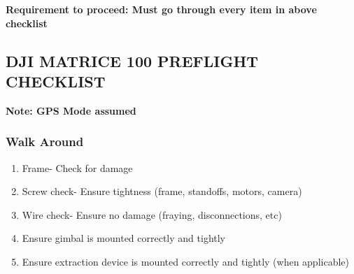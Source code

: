\textbf{Requirement to proceed: Must go through every item in above checklist}







\clearpage
\subsection{DJI MATRICE 100 PREFLIGHT CHECKLIST}
\textbf{Note: GPS Mode assumed}

\subsubsection{Walk Around}
\begin{enumerate}
\setlength{\itemsep}{0em}
\setlength{\parskip}{0em}
\item Frame- Check for damage
\item Screw check- Ensure tightness (frame, standoffs, motors, camera)
\item Wire check- Ensure no damage (fraying, disconnections, etc)
\item Ensure gimbal is mounted correctly and tightly
\item Ensure extraction device is mounted correctly and tightly (when applicable)
\end{enumerate}

